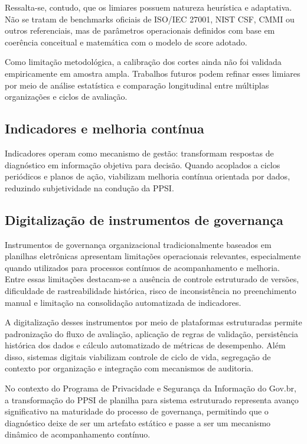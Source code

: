 \documentclass[12pt]{article}
\begin{document}
Ressalta-se, contudo, que os limiares possuem natureza heurística e adaptativa. Não se tratam de benchmarks oficiais de ISO/IEC 27001, NIST CSF, CMMI ou outros referenciais, mas de parâmetros operacionais definidos com base em coerência conceitual e matemática com o modelo de score adotado.

Como limitação metodológica, a calibração dos cortes ainda não foi validada empiricamente em amostra ampla. Trabalhos futuros podem refinar esses limiares por meio de análise estatística e comparação longitudinal entre múltiplas organizações e ciclos de avaliação.

\subsection{Indicadores e melhoria contínua}

Indicadores operam como mecanismo de gestão: transformam respostas de diagnóstico em informação objetiva para decisão. Quando acoplados a ciclos periódicos e planos de ação, viabilizam melhoria contínua orientada por dados, reduzindo subjetividade na condução da PPSI.

\subsection{Digitalização de instrumentos de governança}

Instrumentos de governança organizacional tradicionalmente baseados em planilhas eletrônicas apresentam limitações operacionais relevantes, especialmente quando utilizados para processos contínuos de acompanhamento e melhoria. Entre essas limitações destacam-se a ausência de controle estruturado de versões, dificuldade de rastreabilidade histórica, risco de inconsistência no preenchimento manual e limitação na consolidação automatizada de indicadores.

A digitalização desses instrumentos por meio de plataformas estruturadas permite padronização do fluxo de avaliação, aplicação de regras de validação, persistência histórica dos dados e cálculo automatizado de métricas de desempenho. Além disso, sistemas digitais viabilizam controle de ciclo de vida, segregação de contexto por organização e integração com mecanismos de auditoria.

No contexto do Programa de Privacidade e Segurança da Informação do Gov.br, a transformação do PPSI de planilha para sistema estruturado representa avanço significativo na maturidade do processo de governança, permitindo que o diagnóstico deixe de ser um artefato estático e passe a ser um mecanismo dinâmico de acompanhamento contínuo.
\end{document}
